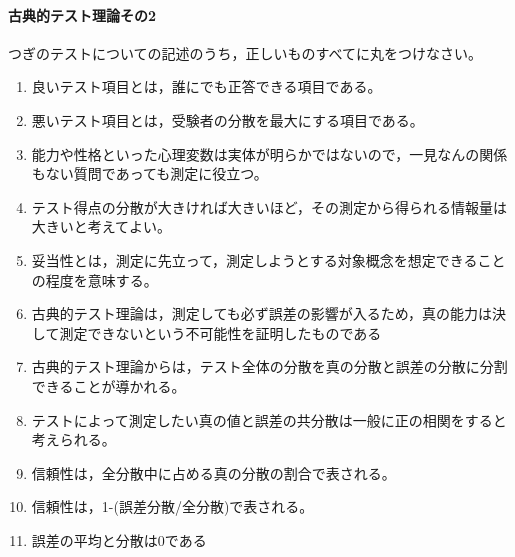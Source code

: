 \documentclass{ltjbook}
\begin{document}
\paragraph{古典的テスト理論その2}つぎのテストについての記述のうち，正しいものすべてに丸をつけなさい。
\begin{enumerate}
	\item 良いテスト項目とは，誰にでも正答できる項目である。
	\item 悪いテスト項目とは，受験者の分散を最大にする項目である。
	\item 能力や性格といった心理変数は実体が明らかではないので，一見なんの関係もない質問であっても測定に役立つ。
	\item テスト得点の分散が大きければ大きいほど，その測定から得られる情報量は大きいと考えてよい。
	\item 妥当性とは，測定に先立って，測定しようとする対象概念を想定できることの程度を意味する。
	\item 古典的テスト理論は，測定しても必ず誤差の影響が入るため，真の能力は決して測定できないという不可能性を証明したものである
	\item 古典的テスト理論からは，テスト全体の分散を真の分散と誤差の分散に分割できることが導かれる。
	\item テストによって測定したい真の値と誤差の共分散は一般に正の相関をすると考えられる。
	\item 信頼性は，全分散中に占める真の分散の割合で表される。
	\item 信頼性は，1-(誤差分散/全分散)で表される。
	\item 誤差の平均と分散は0である
\end{enumerate}
\end{document}
